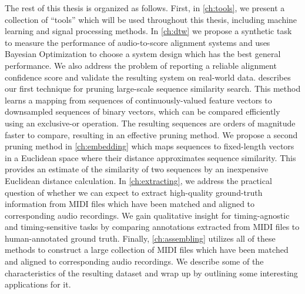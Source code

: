 The rest of this thesis is organized as follows.
First, in \cref{ch:tools}, we present a collection of ``tools'' which will be used throughout this thesis, including machine learning and signal processing methods.
In \cref{ch:dtw} we propose a synthetic task to measure the performance of audio-to-score alignment systems and uses Bayesian Optimization to choose a system design which has the best general performance.
We also address the problem of reporting a reliable alignment confidence score and validate the resulting system on real-world data.
 describes our first technique for pruning large-scale sequence similarity search.
This method learns a mapping from sequences of continuously-valued feature vectors to downsampled sequences of binary vectors, which can be compared efficiently using an exclusive-or operation.
The resulting sequences are orders of magnitude faster to compare, resulting in an effective pruning method.
We propose a second pruning method in \cref{ch:embedding} which maps sequences to fixed-length vectors in a Euclidean space where their distance approximates sequence similarity.
This provides an estimate of the similarity of two sequences by an inexpensive Euclidean distance calculation.
In \cref{ch:extracting}, we address the practical question of whether we can expect to extract high-quality ground-truth information from MIDI files which have been matched and aligned to corresponding audio recordings.
We gain qualitative insight for timing-agnostic and timing-sensitive tasks by comparing annotations extracted from MIDI files to human-annotated ground truth.
Finally, \cref{ch:assembling} utilizes all of these methods to construct a large collection of MIDI files which have been matched and aligned to corresponding audio recordings.
We describe some of the characteristics of the resulting dataset and wrap up by outlining some interesting applications for it.
